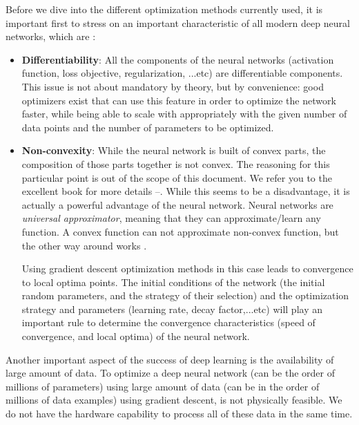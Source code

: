 Before we dive into the different optimization methods currently used, it is important first to stress on an important characteristic of all modern deep neural networks, which are \citep{Goodfellow-et-al-2016}:
\begin{itemize}
    \item \textbf{Differentiability}: All the components of the neural networks (activation function, loss objective, regularization, ...etc) are differentiable components. This issue is not about mandatory by theory, but by convenience: good optimizers exist that can use this feature in order to optimize the network faster, while being able to scale with appropriately with the given number of data points and the number of parameters to be optimized.
    \item \textbf{Non-convexity}: While the neural network is built of convex parts, the composition of those parts together is not convex. The reasoning for this particular point is out of the scope of this document. We refer you to the excellent book \citep{Goodfellow-et-al-2016} for more details --. While this seems to be a disadvantage, it is actually a powerful advantage of the neural network. Neural networks are \textit{universal approximator}, meaning that they can approximate/learn any function. A convex function can not approximate non-convex function, but the other way around works \citep{lecture_nn_optimization}.

    Using gradient descent optimization methods in this case leads to convergence to local optima points. The initial conditions of the network (the initial random parameters, and the strategy of their selection) and the optimization strategy and parameters (learning rate, decay factor,...etc) will play an important rule to determine the convergence characteristics (speed of convergence, and local optima) of the neural network.
\end{itemize}

\par Another important aspect of the success of deep learning is the availability of large amount of data. To optimize a deep neural network (can be the order of millions of parameters) using large amount of data (can be in the order of millions of data examples) using gradient descent, is not physically feasible. We do not have the hardware capability to process all of these data in the same time.

